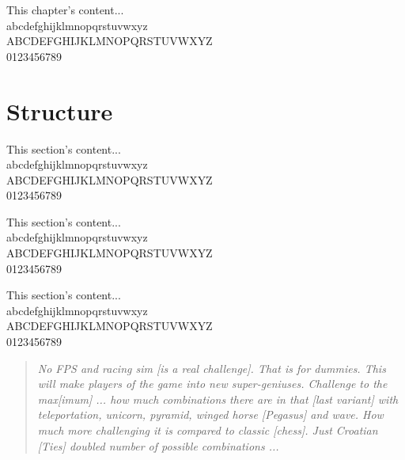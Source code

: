 \documentclass[b5paper,12pt,draft]{book}
\begin{document}
\normalsize{This chapter's content... \\
abcdefghijklmnopqrstuvwxyz \\
ABCDEFGHIJKLMNOPQRSTUVWXYZ \\
0123456789}

\section{Structure}
\small{This section's content... \\
abcdefghijklmnopqrstuvwxyz \\
ABCDEFGHIJKLMNOPQRSTUVWXYZ \\
0123456789}

\tiny{This section's content... \\
abcdefghijklmnopqrstuvwxyz \\
ABCDEFGHIJKLMNOPQRSTUVWXYZ \\
0123456789}

\normalsize{This section's content... \\
abcdefghijklmnopqrstuvwxyz \\
ABCDEFGHIJKLMNOPQRSTUVWXYZ \\
0123456789}

\vspace*{0.1\textheight}
\clearpage

\listoffigures

\listoftables

\tableofcontents
\clearpage


\thispagestyle{empty}
\begin{quotation}
    \it
    No FPS and racing sim [is a real challenge]. That is for
    dummies. This will make players of the game into new
    super-geniuses. Challenge to the max[imum] ... how much
    combinations there are in that [last variant] with
    teleportation, unicorn, pyramid, winged horse [Pegasus]
    and wave. How much more challenging it is compared to
    classic [chess]. Just Croatian [Ties] doubled number of
    possible combinations ...
\end{quotation}
\vfill
\hspace*{\fill}{\LaTeXe}
\clearpage
\end{document}
